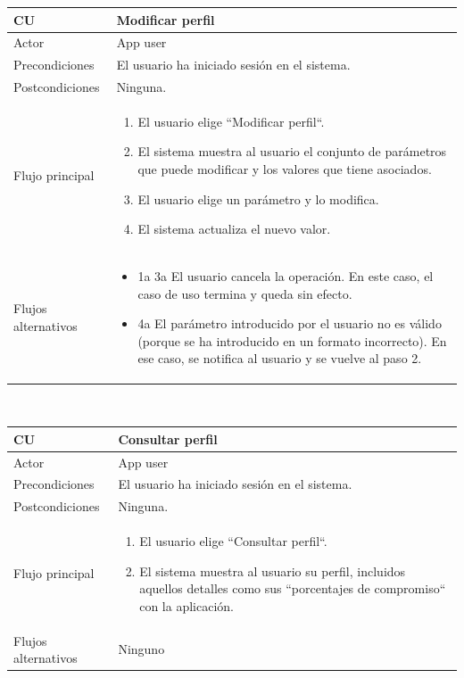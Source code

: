 \documentclass[twoside]{report}
\newcommand\addrow[2]{#1 &#2\\ }
\newcommand\addheading[2]{#1 &#2\\ \hline}
\newcommand\tabularhead{\begin{tabular}{lp{0.7\textwidth}}
\hline
}
\newenvironment{usecase}{\tabularhead}
{\hline\end{tabular}}
\begin{document}
\vspace{0.5cm}

\begin{usecase}
  \addheading{\textbf{CU\arabic{usecase}}}{Modificar perfil} 
  \addrow{Actor}{App user}
  \addrow{Precondiciones}{El usuario ha iniciado sesión en el sistema.}
  \addrow{Postcondiciones}{Ninguna.}
  \addrow{Flujo principal}{
  		\begin{enumerate}
  		\item El usuario elige “Modificar perfil“. %
  		\item El sistema muestra al usuario el conjunto de parámetros que puede modificar y los valores que tiene asociados. %
  		\item El usuario elige un parámetro y lo modifica. %
  		\item El sistema actualiza el nuevo valor. %
  		\end{enumerate}
  }
  \addrow{Flujos alternativos}{
  		\begin{itemize}
  		\item 1a 3a El usuario cancela la operación. En este caso, el caso de uso termina y queda sin efecto.
  		\item 4a El parámetro introducido por el usuario no es válido (porque se ha introducido en un formato incorrecto). En ese caso, se notifica al usuario y se vuelve al paso 2.
  		\end{itemize}
  		}
\end{usecase}\\

\vspace{0.5cm}

\begin{usecase}
  \addheading{\textbf{CU\arabic{usecase}}}{Consultar perfil} 
  \addrow{Actor}{App user}
  \addrow{Precondiciones}{El usuario ha iniciado sesión en el sistema.}
  \addrow{Postcondiciones}{Ninguna.}
  \addrow{Flujo principal}{
  		\begin{enumerate}
  		\item El usuario elige “Consultar perfil“.
  		\item El sistema muestra al usuario su perfil, incluidos aquellos detalles como sus  “porcentajes de compromiso“ con la aplicación.
  		\end{enumerate}
  }
  \addrow{Flujos alternativos}{Ninguno}
\end{usecase}\\

\vspace{0.5cm}
\end{document}
